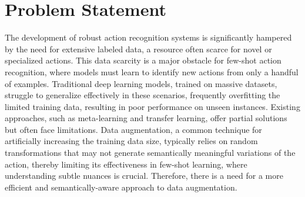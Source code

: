 \section*{Problem Statement}

The development of robust action recognition systems is significantly hampered by the need for extensive labeled data, a resource often scarce for novel or specialized actions. This data scarcity is a major obstacle for few-shot action recognition, where models must learn to identify new actions from only a handful of examples. Traditional deep learning models, trained on massive datasets, struggle to generalize effectively in these scenarios, frequently overfitting the limited training data, resulting in poor performance on unseen instances. Existing approaches, such as meta-learning and transfer learning, offer partial solutions but often face limitations. Data augmentation, a common technique for artificially increasing the training data size, typically relies on random transformations that may not generate semantically meaningful variations of the action, thereby limiting its effectiveness in few-shot learning, where understanding subtle nuances is crucial. Therefore, there is a need for a more efficient and semantically-aware approach to data augmentation.